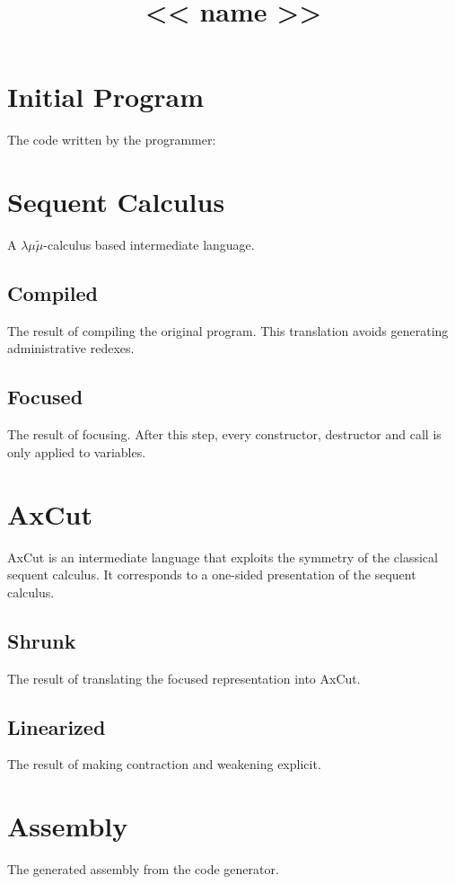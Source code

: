 \documentclass[12pt]{scrartcl}
\date{}
\author{}
\title{<< name >>}
\begin{document}
\maketitle

\section*{Initial Program}
The code written by the programmer:


\section*{Sequent Calculus}
A $\lambda\mu\tilde\mu$-calculus based intermediate language.

\subsection*{Compiled}
The result of compiling the original program.
This translation avoids generating administrative redexes.



\subsection*{Focused}
The result of focusing. After this step, every constructor, destructor and call is only applied to variables.



\section*{AxCut}
AxCut is an intermediate language that exploits the symmetry of the classical sequent calculus. It corresponds to a one-sided presentation of the sequent calculus.

\subsection*{Shrunk}
The result of translating the focused representation into AxCut.



\subsection*{Linearized}
The result of making contraction and weakening explicit.



\section*{Assembly}
The generated assembly from the code generator.

\end{document}
